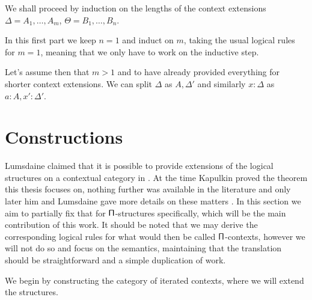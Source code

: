 We shall proceed by induction on the lengths of the context extensions
$\Delta=A_1,\ldots,A_m$, $\Theta=B_1,\ldots,B_n$.

\begin{construction}[Part 1]
  In this first part we keep $n=1$ and induct on $m$, taking the usual logical
  rules for $m=1$, meaning that we only have to work on the inductive step.

  \noindent
  Let's assume then that $m>1$ and to have already provided everything for
  shorter context extensions. We can split $\Delta$ as $A,\Delta'$ and similarly
  $x:\Delta$ as $a:A,x':\Delta'$.
\end{construction}

\section{Constructions}

Lumsdaine claimed that it is possible to provide extensions of the logical
structures on a contextual category in \cite[26]{Lum10}. At the
time Kapulkin proved the theorem this thesis focuses on,
nothing further was available in the literature and only later him and
Lumsdaine gave more details on these matters \cite{KL18}. In this section we aim
to partially fix that for $\operatorname{\mathsf{\Pi}}$-structures specifically, which will be the main
contribution of this work. It should be noted that we may derive the
corresponding logical rules for what would then be called $\operatorname{\mathsf{\Pi}}$-contexts,
however we will not do so and focus on the semantics, maintaining that the
translation should be straightforward and a simple duplication of work.

We begin by constructing the category of iterated contexts, where we
will extend the structures.

